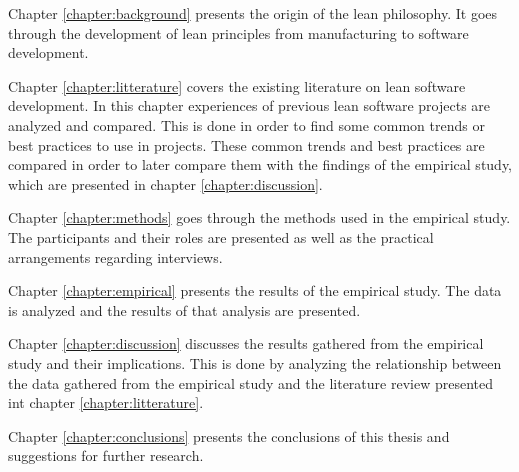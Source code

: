 Chapter \ref{chapter:background} presents the origin of the lean philosophy. It goes through the development of lean principles from manufacturing to software development.

Chapter \ref{chapter:litterature} covers the existing literature on lean software development. In this chapter experiences of previous lean software projects are analyzed and compared. This is done in order to find some common trends or best practices to use in projects. These common trends and best practices are compared in order to later compare them with the findings of the empirical study, which are presented in chapter \ref{chapter:discussion}.

Chapter \ref{chapter:methods} goes through the methods used in the empirical study. The participants and their roles are presented as well as the practical arrangements regarding interviews.

Chapter \ref{chapter:empirical} presents the results of the empirical study. The data is analyzed and the results of that analysis are presented.

Chapter \ref{chapter:discussion} discusses the results gathered from the empirical study and their implications. This is done by analyzing the relationship between the data gathered from the empirical study and the literature review presented int chapter \ref{chapter:litterature}.

Chapter \ref{chapter:conclusions} presents the conclusions of this thesis and suggestions for further research.
